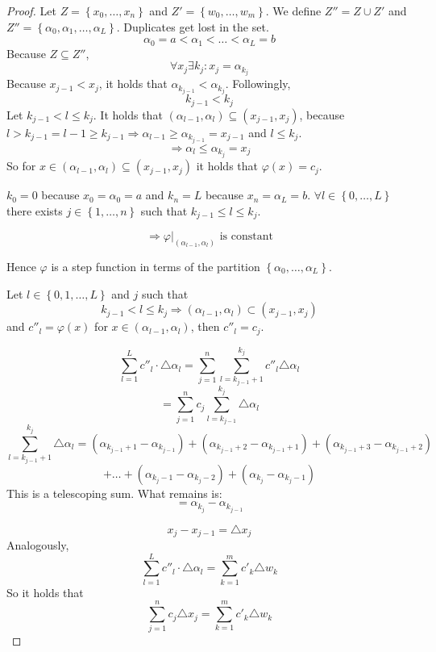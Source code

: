 \documentclass[a4paper,landscape,twocolumn]{article}
\theoremstyle{definition}
\newcommand\set[1]{\left\{#1\right\}}
\begin{document}
\begin{proof}
  Let $Z = \set{x_0, \ldots, x_n}$ and $Z' = \set{w_0,\ldots,w_m}$.
  We define $Z'' = Z \cup Z'$ and $Z'' = \set{\alpha_0, \alpha_1, \ldots, \alpha_L}$.
  Duplicates get lost in the set.
  \[ \alpha_0 = a < \alpha_1 < \ldots < \alpha_L = b \]
  Because $Z \subseteq Z''$,
  \[ \forall x_j \exists k_j: x_j = \alpha_{k_j} \]
  Because $x_{j-1} < x_j$, it holds that $\alpha_{k_{j-1}} < \alpha_{k_j}$.
  Followingly,
  \[ k_{j-1} < k_j \]
  Let $k_{j-1} < l \leq k_j$.
  It holds that $(\alpha_{l-1}, \alpha_l) \subseteq (x_{j-1}, x_j)$,
  because $l > k_{j-1} = l-1 \geq k_{j-1} \Rightarrow \alpha_{l-1} \geq \alpha_{k_{j-1}} = x_{j-1}$
  and $l \leq k_j$.
  \[ \Rightarrow \alpha_l \leq \alpha_{k_j} = x_j \]
  So for $x \in (\alpha_{l-1}, \alpha_l) \subseteq (x_{j-1}, x_j)$ it holds that
  $\varphi(x) = c_j$.

  $k_0 = 0$ because $x_0 = \alpha_0 = a$ and $k_n = L$ because $x_n = \alpha_L = b$.
  $\forall l \in \set{0,\ldots,L}$ there exists $j \in \set{1,\ldots,n}$ such that
  $k_{j-1} \leq l \leq k_j$.

  \[ \Rightarrow \varphi|_{(\alpha_{l-1},\alpha_l)} \text{ is constant} \]

  Hence $\varphi$ is a step function in terms of the partition $\set{\alpha_0, \ldots, \alpha_L}$.

  Let $l \in \set{0,1,\ldots,L}$ and $j$ such that
  \[ k_{j-1} < l \leq k_j \Rightarrow (\alpha_{l-1},\alpha_l) \subset (x_{j-1},x_j) \]
  and $c''_l = \varphi(x)$ for $x \in (\alpha_{l-1},\alpha_l)$, then $c''_l = c_j$.

  \[ \sum_{l=1}^L c''_l \cdot \triangle \alpha_l = \sum_{j=1}^n \sum_{l=k_{j-1}+1}^{k_j} c''_l \triangle \alpha_l \]
  \[ = \sum_{j=1}^n c_j \sum_{l=k_{j-1}}^{k_j} \triangle \alpha_l \]
  \[ \sum_{l=k_{j-1} + 1}^{k_j} \triangle \alpha_l = (\alpha_{k_{j-1}+1} - \alpha_{k_{j-1}})
    + (\alpha_{k_{j-1}+2} - \alpha_{k_{j-1}+1}) + (\alpha_{k_{j-1}+3} - \alpha_{k_{j-1}+2})
  \] \[
    + \ldots + (\alpha_{k_j-1} - \alpha_{k_j-2}) + (\alpha_{k_j} - \alpha_{k_j-1})
  \]
  This is a telescoping sum. What remains is:
  \[ = \alpha_{k_j} - \alpha_{k_{j-1}} \]

  \[ x_j - x_{j-1} = \triangle x_j \]
  Analogously,
  \[ \sum_{l=1}^L c''_l \cdot \triangle \alpha_l = \sum_{k=1}^m c'_k \triangle w_k \]
  So it holds that
  \[ \sum_{j=1}^n c_j \triangle x_j = \sum_{k=1}^m c'_k \triangle w_k \]
\end{proof}
\end{document}
